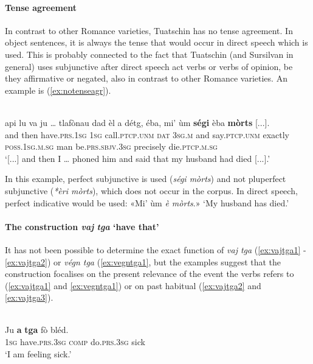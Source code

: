 \paragraph{Tense agreement}
In contrast to other Romance varieties, Tuatschin has no tense agreement. In object sentences, it is always the tense that would occur in direct speech which is used. This is probably connected to the fact that Tuatschin (and Sursilvan in general) uses subjunctive after direct speech act verbs or verbs of opinion, be they affirmative or negated, also in contrast to other Romance varieties. An example is (\ref{ex:notenseagr}).

\ea
\label{ex:notenseagr}
\\
\gll  [...] api lu va ju … tlafònau dad èl a détg, éba, mi' ùm \textbf{ségi} èba \textbf{mòrts} [...]. \\
{} and then have.\textsc{prs.1sg} \textsc{1sg} {} call.\textsc{ptcp.unm} \textsc{dat} \textsc{3sg.m} and say.\textsc{ptcp.unm} exactly \textsc{poss.1sg.m.sg} man be.\textsc{prs.sbjv.3sg} precisely die.\textsc{ptcp.m.sg} \\ 
\glt `[...] and then I … phoned him and said that my husband had died [...].'
\z

In this example, perfect subjunctive is used (\textit{ségi mòrts}) and not pluperfect subjunctive (\textit{*èri mòrts}), which does not occur in the corpus. In direct speech, perfect indicative would be used: «Mi' ùm \textit{è mòrts}.» `My husband has died.'

\paragraph{The construction \textit{vaj} \textit{tga} `have that'}
It has not been possible to determine the exact function of \textit{vaj tga} (\ref{ex:vajtga1} - \ref{ex:vajtga2}) or \textit{végn tga} (\ref{ex:vegntga1}, but the examples suggest that the construction focalises on the present relevance of the event the verbs refers to (\ref{ex:vajtga1} and \ref{ex:vegntga1}) or on past habitual (\ref{ex:vajtga2} and \ref{ex:vajtga3}).

\ea
\label{ex:vajtga1}
\\
\gll  Ju \textbf{a} \textbf{tga} fò bléd.\\
\textsc{1sg} have.\textsc{prs.3sg} \textsc{comp} do.\textsc{prs.3sg} sick\\
\glt `I am feeling sick.'
\z


